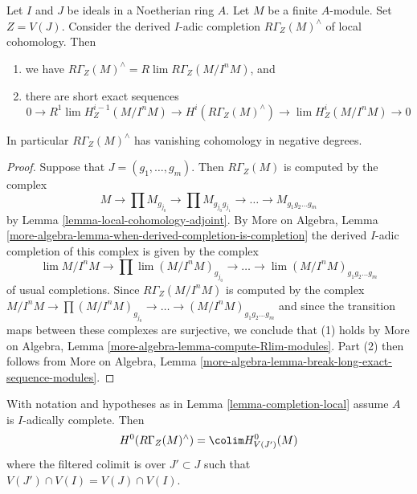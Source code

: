 \begin{lemma}
\label{lemma-completion-local}
Let $I$ and $J$ be ideals in a Noetherian ring $A$. Let $M$ be a finite
$A$-module. Set $Z =V(J)$. Consider the derived $I$-adic completion
$R\Gamma_Z(M)^\wedge$ of local cohomology. Then
\begin{enumerate}
\item we have $R\Gamma_Z(M)^\wedge = R\lim R\Gamma_Z(M/I^nM)$, and
\item there are short exact sequences
$$
0 \to R^1\lim H^{i - 1}_Z(M/I^nM) \to H^i(R\Gamma_Z(M)^\wedge) \to
\lim H^i_Z(M/I^nM) \to 0
$$
\end{enumerate}
In particular $R\Gamma_Z(M)^\wedge$ has vanishing cohomology
in negative degrees.
\end{lemma}

\begin{proof}
Suppose that $J = (g_1, \ldots, g_m)$.
Then $R\Gamma_Z(M)$ is computed by the complex
$$
M \to \prod M_{g_{j_0}} \to \prod M_{g_{j_0}g_{j_1}} \to
\ldots \to M_{g_1g_2\ldots g_m}
$$
by Lemma \ref{lemma-local-cohomology-adjoint}.
By More on Algebra, Lemma
\ref{more-algebra-lemma-when-derived-completion-is-completion}
the derived $I$-adic completion of
this complex is given by the complex
$$
\lim M/I^nM \to \prod \lim (M/I^nM)_{g_{j_0}} \to
\ldots \to \lim (M/I^nM)_{g_1g_2\ldots g_m}
$$
of usual completions. Since $R\Gamma_Z(M/I^nM)$ is computed by
the complex $ M/I^nM \to \prod (M/I^nM)_{g_{j_0}} \to
\ldots \to (M/I^nM)_{g_1g_2\ldots g_m}$ and since the
transition maps between these complexes are surjective,
we conclude that (1) holds by
More on Algebra, Lemma \ref{more-algebra-lemma-compute-Rlim-modules}.
Part (2) then follows from More on Algebra, Lemma
\ref{more-algebra-lemma-break-long-exact-sequence-modules}.
\end{proof}

\begin{lemma}
\label{lemma-completion-local-H0}
With notation and hypotheses as in Lemma \ref{lemma-completion-local}
assume $A$ is $I$-adically complete. Then
$$
H^0(R\Gamma_Z(M)^\wedge) = \colim H^0_{V(J')}(M)
$$
where the filtered colimit is over $J' \subset J$ such that
$V(J') \cap V(I) = V(J) \cap V(I)$.
\end{lemma}

